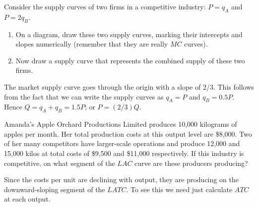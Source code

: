 \begin{enumialphparenastyle}
\begin{ex}\label{ex:ch9ex4}
Consider the supply curves of two firms in a competitive industry: $P=q_A$ and $P=2q_B$.
\begin{enumerate}
	\item	On a diagram, draw these two supply curves, marking their intercepts and slopes numerically (remember that they are really $MC$ curves). 
	\item	Now draw a supply curve that represents the combined supply of these two firms.
\end{enumerate}
\begin{sol}
	The market supply curve goes through the origin with a slope of	2/3. This follows from the fact that we can write the supply curves as $q_A=P$ and $q_B=0.5P$. Hence $Q=q_A+q_B=1.5P$; or $P=(2/3)Q$.
	
\end{sol}
\end{ex}

\begin{ex}\label{ex:ch9ex5}
Amanda's Apple Orchard Productions Limited produces 10,000 kilograms of apples per month. Her total production costs at this output level are \$8,000. Two of her many competitors have larger-scale operations and produce 12,000 and 15,000 kilos at total costs of \$9,500 and \$11,000 respectively. If this industry is competitive, on what segment of the $LAC$ curve are these producers producing? 
\begin{sol}
	Since the costs per unit are declining with output, they are producing on the downward-sloping segment of the $LATC$. To see this we need just calculate $ATC$ at each output.
	
\end{sol}
\end{ex}


\end{enumialphparenastyle}
